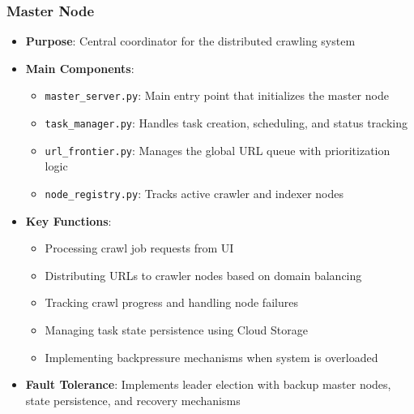 \documentclass[12pt,a4paper]{report}
\begin{document}
\subsubsection{Master Node}
\begin{itemize}
    \item \textbf{Purpose}: Central coordinator for the distributed crawling system
    \item \textbf{Main Components}:
    \begin{itemize}
        \item \texttt{master\_server.py}: Main entry point that initializes the master node
        \item \texttt{task\_manager.py}: Handles task creation, scheduling, and status tracking
        \item \texttt{url\_frontier.py}: Manages the global URL queue with prioritization logic
        \item \texttt{node\_registry.py}: Tracks active crawler and indexer nodes
    \end{itemize}
    \item \textbf{Key Functions}:
    \begin{itemize}
        \item Processing crawl job requests from UI
        \item Distributing URLs to crawler nodes based on domain balancing
        \item Tracking crawl progress and handling node failures
        \item Managing task state persistence using Cloud Storage
        \item Implementing backpressure mechanisms when system is overloaded
    \end{itemize}
    \item \textbf{Fault Tolerance}: Implements leader election with backup master nodes, state persistence, and recovery mechanisms
\end{itemize}
\end{document}
